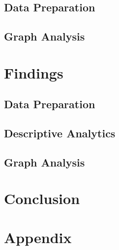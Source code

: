 \documentclass[conference]{IEEEtran}
\begin{document}
\subsection{Data Preparation}
\label{methods-data-preparation}


\subsection{Graph Analysis}
\label{methods-graph-analysis}


\section{Findings}
\label{findings}
\subsection{Data Preparation}
\label{findings-data-preparation}


\subsection{Descriptive Analytics}
\label{findings-descriptive}


\subsection{Graph Analysis}
\label{findings-graph-analysis}


\section{Conclusion}
\label{conclusion}





\onecolumn
\section{Appendix}
\label{appendix}

\end{document}
